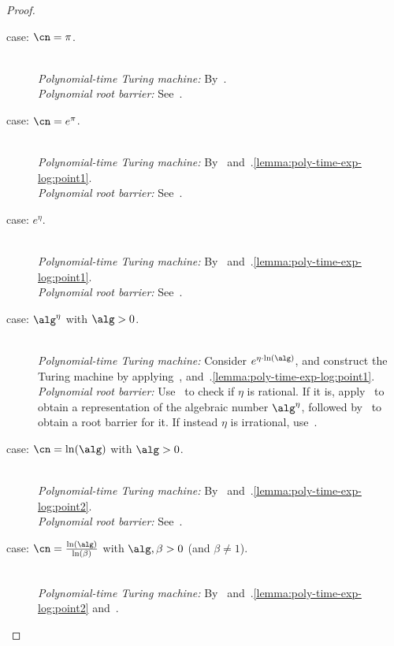 \begin{proof}
  \begin{description}
    \item[case: $\cn = \pi$.]~\\
    \textit{Polynomial-time Turing machine:} By~.\\
    \textit{Polynomial root barrier:} See~. 
    \item[case: $\cn = e^\pi$.]~\\
    \textit{Polynomial-time Turing machine:} By~ and~.\ref{lemma:poly-time-exp-log:point1}.\\
    \textit{Polynomial root barrier:} See~.
    \item[case: $e^\eta$.]~\\
    \textit{Polynomial-time Turing machine:} By~ and~.\ref{lemma:poly-time-exp-log:point1}.\\
    \textit{Polynomial root barrier:} See~.
    \item[case: $\alg^\eta$ with $\alg > 0$.]~\\
    \textit{Polynomial-time Turing machine:} Consider $e^{\eta \cdot \ln(\alg)}$, and construct the Turing machine by applying~,  and~.\ref{lemma:poly-time-exp-log:point1}.\\
    \textit{Polynomial root barrier:} Use~ to check if $\eta$ is rational. If it is, apply~ to obtain a representation of the algebraic number $\alg^\eta$, followed by~ to obtain a root barrier for it. If instead $\eta$ is irrational, use~.
    \item[case: $\cn = \ln(\alg)$ with $\alg > 0$.]~\\
    \textit{Polynomial-time Turing machine:} By~ and~.\ref{lemma:poly-time-exp-log:point2}.\\
    \textit{Polynomial root barrier:} See~. 
    \item[case: $\cn = \frac{\ln(\alg)}{\ln(\beta)}$ with $\alg,\beta > 0$ (and $\beta \neq 1$).]~\\
    \textit{Polynomial-time Turing machine:} By~ and~.\ref{lemma:poly-time-exp-log:point2} and~.\\

\end{description}
\end{proof}
